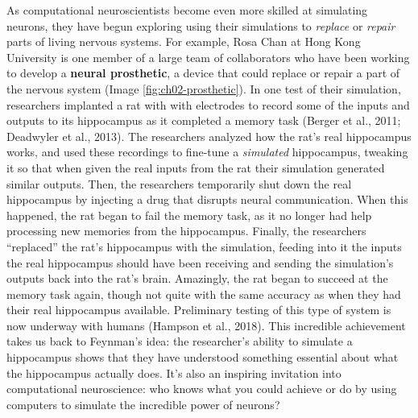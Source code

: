 \documentclass[
]{book}
\begin{document}
As computational neuroscientists become even more skilled at simulating neurons, they have begun exploring using their simulations to \emph{replace} or \emph{repair} parts of living nervous systems. For example, Rosa Chan at Hong Kong University is one member of a large team of collaborators who have been working to develop a \textbf{neural prosthetic}, a device that could replace or repair a part of the nervous system (Image \ref{fig:ch02-prosthetic}). In one test of their simulation, researchers implanted a rat with with electrodes to record some of the inputs and outputs to its hippocampus as it completed a memory task (Berger et al., 2011; Deadwyler et al., 2013). The researchers analyzed how the rat's real hippocampus works, and used these recordings to fine-tune a \emph{simulated} hippocampus, tweaking it so that when given the real inputs from the rat their simulation generated similar outputs. Then, the researchers temporarily shut down the real hippocampus by injecting a drug that disrupts neural communication. When this happened, the rat began to fail the memory task, as it no longer had help processing new memories from the hippocampus. Finally, the researchers ``replaced'' the rat's hippocampus with the simulation, feeding into it the inputs the real hippocampus should have been receiving and sending the simulation's outputs back into the rat's brain. Amazingly, the rat began to succeed at the memory task again, though not quite with the same accuracy as when they had their real hippocampus available. Preliminary testing of this type of system is now underway with humans (Hampson et al., 2018). This incredible achievement takes us back to Feynman's idea: the researcher's ability to simulate a hippocampus shows that they have understood something essential about what the hippocampus actually does. It's also an inspiring invitation into computational neuroscience: who knows what you could achieve or do by using computers to simulate the incredible power of neurons?
\end{document}
